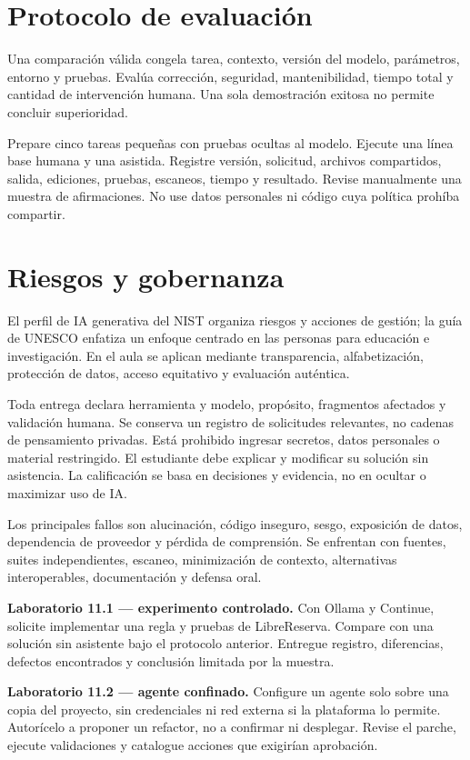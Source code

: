 \section{Protocolo de evaluación}

Una comparación válida congela tarea, contexto, versión del modelo, parámetros, entorno y pruebas. Evalúa corrección, seguridad, mantenibilidad, tiempo total y cantidad de intervención humana. Una sola demostración exitosa no permite concluir superioridad.

\begin{validacion}
Prepare cinco tareas pequeñas con pruebas ocultas al modelo. Ejecute una línea base humana y una asistida. Registre versión, solicitud, archivos compartidos, salida, ediciones, pruebas, escaneos, tiempo y resultado. Revise manualmente una muestra de afirmaciones. No use datos personales ni código cuya política prohíba compartir.
\end{validacion}

\section{Riesgos y gobernanza}

El perfil de IA generativa del NIST organiza riesgos y acciones de gestión; la guía de UNESCO enfatiza un enfoque centrado en las personas para educación e investigación. En el aula se aplican mediante transparencia, alfabetización, protección de datos, acceso equitativo y evaluación auténtica.

\begin{politicaia}
Toda entrega declara herramienta y modelo, propósito, fragmentos afectados y validación humana. Se conserva un registro de solicitudes relevantes, no cadenas de pensamiento privadas. Está prohibido ingresar secretos, datos personales o material restringido. El estudiante debe explicar y modificar su solución sin asistencia. La calificación se basa en decisiones y evidencia, no en ocultar o maximizar uso de IA.
\end{politicaia}

Los principales fallos son alucinación, código inseguro, sesgo, exposición de datos, dependencia de proveedor y pérdida de comprensión. Se enfrentan con fuentes, suites independientes, escaneo, minimización de contexto, alternativas interoperables, documentación y defensa oral.

\begin{ejercicio}
\textbf{Laboratorio 11.1 --- experimento controlado.} Con Ollama y Continue, solicite implementar una regla y pruebas de LibreReserva. Compare con una solución sin asistente bajo el protocolo anterior. Entregue registro, diferencias, defectos encontrados y conclusión limitada por la muestra.

\textbf{Laboratorio 11.2 --- agente confinado.} Configure un agente solo sobre una copia del proyecto, sin credenciales ni red externa si la plataforma lo permite. Autorícelo a proponer un refactor, no a confirmar ni desplegar. Revise el parche, ejecute validaciones y catalogue acciones que exigirían aprobación.
\end{ejercicio}

